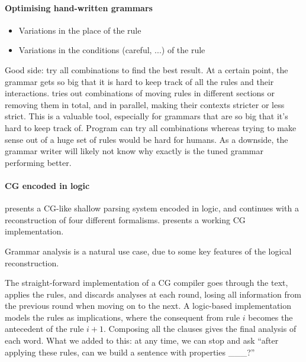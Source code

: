 


\paragraph{Optimising hand-written grammars}
\begin{itemize}
\item Variations in the place of the rule
\item Variations in the conditions (careful, ...) of the rule
\end{itemize}
Good side: try all combinations to find the best result. 
At a certain point, the grammar gets so big that it is hard to keep track of all the rules and their interactions. \cite{bick2013tuning} tries out combinations of moving rules in different sections or removing them in total, and in parallel, making their contexts stricter or less strict. 
This is a valuable tool, especially for grammars that are so big that it's hard to keep track of. Program can try all combinations whereas trying to make sense out of a huge set of rules would be hard for humans.
As a downside, the grammar writer will likely not know why exactly is the tuned grammar performing better.


\paragraph{CG encoded in logic}

\cite{lager98} presents a CG-like shallow parsing system encoded in logic, and \cite{lager_nivre2001} continues with a reconstruction of four different formalisms. \cite{listenmaa_claessen2015} presents a working CG implementation.

Grammar analysis is a natural use case, due to some key features of the logical reconstruction.

The straight-forward implementation of a CG compiler goes through the text, applies the rules, and discards analyses at each round, losing all information from the previous round when moving on to the next.
A logic-based implementation models the rules as implications, where the consequent from rule $i$ becomes the antecedent of the rule $i+1$. 
Composing all the clauses gives the final analysis of each word.
What we added to this: at any time, we can stop and ask 
``after applying these rules, can we build a sentence with properties \_\_\_?''





